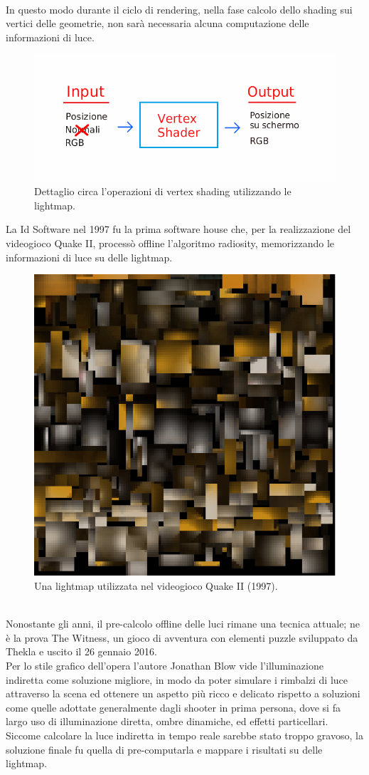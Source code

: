 \\
In questo modo durante il ciclo di rendering, nella fase calcolo dello shading sui vertici delle geometrie, non sarà necessaria alcuna computazione delle informazioni di luce.
\newpage 
\begin{figure}[htb]
 \centering
 \includegraphics[width=0.8\linewidth]{images/chapter_stato_arte/stato_arte_ver_sh.jpg}\hfill
 \caption[Vertex shading lightmap]{Dettaglio circa l'operazioni di vertex shading utilizzando le lightmap.}
 \label{fig:stato_arte_ver_sh}
\end{figure}
La Id Software nel 1997 fu la prima software house che, per la realizzazione del videogioco Quake II, processò offline l’algoritmo radiosity, memorizzando le informazioni di luce su delle lightmap.
\\
\begin{figure}[htb]
 \centering
 \includegraphics[width=0.4\linewidth]{images/chapter_stato_arte/stato_arte_quake_lightmap.png}\hfill
 \caption[Lightmap Quake II]{Una lightmap utilizzata nel videogioco Quake II (1997).}
 \label{fig:stato_arte_quake_lightmap}
\end{figure}
\\
Nonostante gli anni, il pre-calcolo offline delle luci rimane una tecnica attuale; ne è la prova The Witness, un gioco di avventura con elementi puzzle sviluppato da Thekla e uscito il 26 gennaio 2016. 
\\
Per lo stile grafico dell’opera l’autore Jonathan Blow vide l’illuminazione indiretta come soluzione migliore, in modo da poter simulare i rimbalzi di luce attraverso la scena ed ottenere un aspetto più ricco e delicato rispetto a soluzioni come quelle adottate generalmente dagli shooter in prima persona, dove si fa largo uso di illuminazione diretta, ombre dinamiche, ed effetti particellari. Siccome calcolare la luce indiretta in tempo reale sarebbe stato troppo gravoso, la soluzione finale fu quella di pre-computarla e mappare i risultati su delle   lightmap.	
